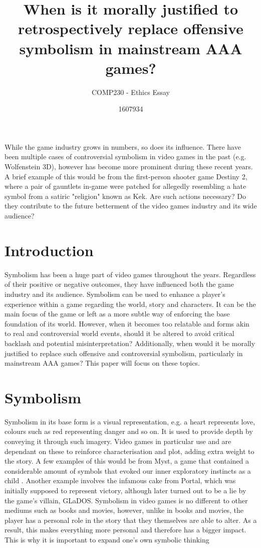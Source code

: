 \documentclass{scrartcl}
\title{When is it morally justified to retrospectively replace offensive symbolism in mainstream AAA games?}
\subtitle{COMP230 - Ethics Essay}
\author{1607934}
\begin{document}
\maketitle

\abstract{} 
While the game industry grows in numbers, so does its influence. There have been multiple cases of controversial symbolism in video games in the past (e.g. Wolfenstein 3D), however has become more prominent during these recent years. A brief example of this would be from the first-person shooter game Destiny 2, where a pair of gauntlets in-game were patched for allegedly resembling a hate symbol from a satiric "religion" known as Kek. Are such actions necessary? Do they contribute to the future betterment of the video games industry and its wide audience?

\section{Introduction}
Symbolism has been a huge part of video games throughout the years. Regardless of their positive or negative outcomes, they have influenced both the game industry and its audience. Symbolism can be used to enhance a player's experience within a game regarding the world, story and characters. It can be the main focus of the game or left as a more subtle way of enforcing the base foundation of its world. However, when it becomes too relatable and forms akin to real and controversial world events, should it be altered to avoid critical backlash and potential misinterpretation? Additionally, when would it be morally justified to replace such offensive and controversial symbolism, particularly in mainstream AAA games? This paper will focus on these topics.


\section{Symbolism}
Symbolism in its base form is a visual representation, e.g. a heart represents love, colours such as red representing danger and so on. It is used to provide depth by conveying it through such imagery. Video games in particular use and are dependant on these to reinforce characterisation and plot, adding extra weight to the story. A few examples of this would be from Myst, a game that contained a considerable amount of symbols that evoked our inner exploratory instincts as a child \cite{xander}. Another example involves the infamous cake from Portal, which was initially supposed to represent victory, although later turned out to be a lie by the game's villain, GLaDOS. Symbolism in video games is no different to other mediums such as books and movies, however, unlike in books and movies, the player has a personal role in the story that they themselves are able to alter. As a result, this makes everything more personal and therefore has a bigger impact. This is why it is important to expand one's own symbolic thinking \cite{xander}
\end{document}
